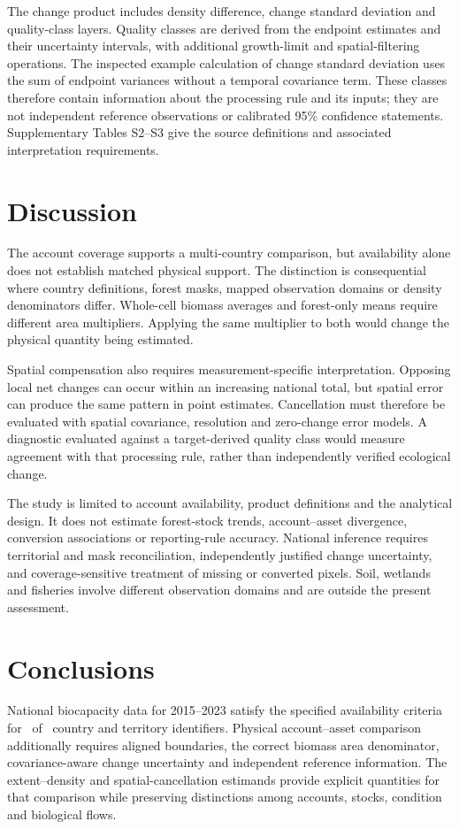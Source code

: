 \documentclass[11pt,a4paper]{article}
\begin{document}
The change product includes density difference, change standard deviation and quality-class layers. Quality classes are derived from the endpoint estimates and their uncertainty intervals, with additional growth-limit and spatial-filtering operations. The inspected example calculation of change standard deviation uses the sum of endpoint variances without a temporal covariance term. These classes therefore contain information about the processing rule and its inputs; they are not independent reference observations or calibrated 95\% confidence statements. Supplementary Tables S2--S3 give the source definitions and associated interpretation requirements.

\section{Discussion}
The account coverage supports a multi-country comparison, but availability alone does not establish matched physical support. The distinction is consequential where country definitions, forest masks, mapped observation domains or density denominators differ. Whole-cell biomass averages and forest-only means require different area multipliers. Applying the same multiplier to both would change the physical quantity being estimated.

Spatial compensation also requires measurement-specific interpretation. Opposing local net changes can occur within an increasing national total, but spatial error can produce the same pattern in point estimates. Cancellation must therefore be evaluated with spatial covariance, resolution and zero-change error models. A diagnostic evaluated against a target-derived quality class would measure agreement with that processing rule, rather than independently verified ecological change.

The study is limited to account availability, product definitions and the analytical design. It does not estimate forest-stock trends, account--asset divergence, conversion associations or reporting-rule accuracy. National inference requires territorial and mask reconciliation, independently justified change uncertainty, and coverage-sensitive treatment of missing or converted pixels. Soil, wetlands and fisheries involve different observation domains and are outside the present assessment.

\section{Conclusions}
National biocapacity data for 2015--2023 satisfy the specified availability criteria for \AccountPass\ of \CountryIDs\ country and territory identifiers. Physical account--asset comparison additionally requires aligned boundaries, the correct biomass area denominator, covariance-aware change uncertainty and independent reference information. The extent--density and spatial-cancellation estimands provide explicit quantities for that comparison while preserving distinctions among accounts, stocks, condition and biological flows.
\end{document}
